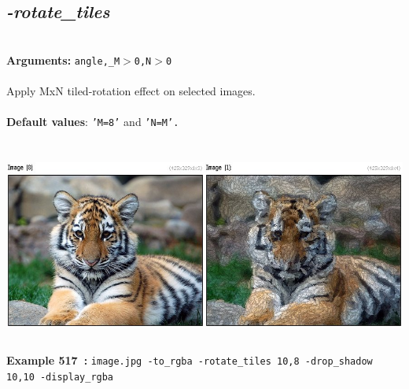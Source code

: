 \documentclass[a4paper,11pt,twoside]{book}
\begin{document}
\subsection{\emph{-rotate\_tiles} }\vspace*{-0.5em}
~\\\textbf{Arguments: } 
{\small \texttt{angle,\_M$>$0,N$>$0}}\\~\\
Apply MxN tiled-rotation effect on selected images.
~\\~\\\textbf{Default values}: {\small \texttt{'M=8'} and \texttt{'N=M'.}}
\begin{center}\includegraphics[keepaspectratio=true,height=7cm,width=\textwidth]{img/gmic_def517.jpg}\\
{\footnotesize \textbf{Example 517~:} \texttt{image.jpg -to\_rgba -rotate\_tiles 10,8 -drop\_shadow 10,10 -display\_rgba}}
\end{center}
\end{document}
